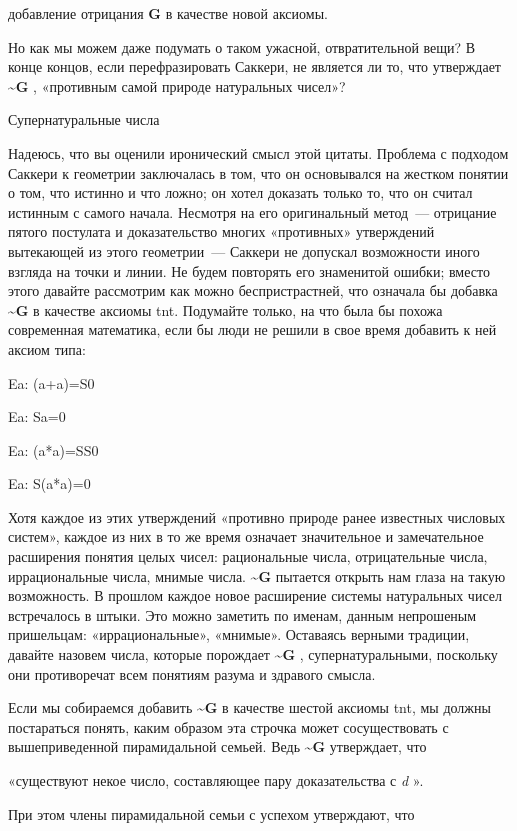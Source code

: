 \documentclass[../main.tex]{subfiles}
\begin{document}
добавление отрицания \textbf{G} в качестве новой аксиомы.

Но как мы можем даже подумать о таком ужасной, отвратительной вещи? В конце концов, если перефразировать Саккери, не является ли то, что утверждает \textbf{\textasciitilde G} , «противным самой природе натуральных чисел»?

Супернатуральные числа

Надеюсь, что вы оценили иронический смысл этой цитаты. Проблема с подходом Саккери к геометрии заключалась в том, что он основывался на жестком понятии о том, что истинно и что ложно; он хотел доказать только то, что он считал истинным с самого начала. Несмотря на его оригинальный метод~--- отрицание пятого постулата и доказательство многих «противных» утверждений вытекающей из этого геометрии~--- Саккери не допускал возможности иного взгляда на точки и линии. Не будем повторять его знаменитой ошибки; вместо этого давайте рассмотрим как можно беспристрастней, что означала бы добавка \textbf{\textasciitilde G} в качестве аксиомы \acs{tnt}\@. Подумайте только, на что была бы похожа современная математика, если бы люди не решили в свое время добавить к ней аксиом типа:

Ea: (a+a)=S0

Ea: Sa=0

Ea: (a*a)=SS0

Ea: S(a*a)=0

Хотя каждое из этих утверждений «противно природе ранее известных числовых систем», каждое из них в то же время означает значительное и замечательное расширения понятия целых чисел: рациональные числа, отрицательные числа, иррациональные числа, мнимые числа. \textbf{\textasciitilde G} пытается открыть нам глаза на такую возможность. В прошлом каждое новое расширение системы натуральных чисел встречалось в штыки. Это можно заметить по именам, данным непрошеным пришельцам: «иррациональные», «мнимые». Оставаясь верными традиции, давайте назовем числа, которые порождает \textbf{\textasciitilde G} , супернатуральными, поскольку они противоречат всем понятиям разума и здравого смысла.

Если мы собираемся добавить \textbf{\textasciitilde G} в качестве шестой аксиомы \acs{tnt}, мы должны постараться понять, каким образом эта строчка может сосуществовать с вышеприведенной пирамидальной семьей. Ведь \textbf{\textasciitilde G} утверждает, что

«существуют некое число, составляющее пару доказательства с \emph{d} ».

При этом члены пирамидальной семьи с успехом утверждают, что
\end{document}
